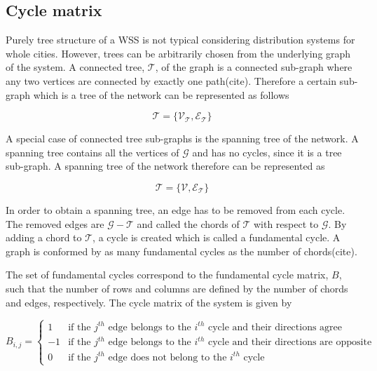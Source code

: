 \subsection{Cycle matrix}
\label{cycle_matrix}

Purely tree structure of a WSS is not typical considering distribution systems for whole cities. However, trees can be arbitrarily chosen from the underlying graph of the system. A connected tree, $\mathcal{T} $, of the graph is a connected sub-graph where any two vertices are connected by exactly one path(cite). Therefore a certain sub-graph which is a tree of the network can be represented as follows

\begin{equation}
  \label{Numberofchords}
  \mathcal{T} = \{\mathcal{V_{\mathcal{T}}}, \mathcal{E_{\mathcal{T}}} \} 
\end{equation}

A special case of connected tree sub-graphs is the spanning tree of the network. A spanning tree contains all the vertices of $\mathcal{G}$ and has no cycles, since it is a tree sub-graph. A spanning tree of the network therefore can be represented as

\begin{equation}
  \label{Numberofchords}
  \mathcal{T} = \{\mathcal{V}, \mathcal{E_{\mathcal{T}}} \} 
\end{equation}

In order to obtain a spanning tree, an edge has to be removed from each cycle. The removed edges are $\mathcal{G} - \mathcal{T}$ and called the chords of $\mathcal{T}$ with respect to $\mathcal{G}$. By adding a chord to $\mathcal{T}$, a cycle is created which is called a fundamental cycle. A graph is conformed by as many fundamental cycles as the number of chords(cite).

The set of fundamental cycles correspond to the fundamental cycle matrix, $B$, such that the number of rows and columns are defined by the number of chords and edges, respectively. The cycle matrix of the system is given by

\begin{equation}
\label{DiGraphCycle}
 B_{i,j} =
		\left\{
		\begin{array}{ll}
		
		1 			&     \text{if the $j^{th}$ edge belongs to the $i^{th}$ cycle and their directions agree}	
\\
		-1          &     \text{if the $j^{th}$ edge belongs to the $i^{th}$ cycle and their directions are opposite}
\\
        0           &     \text{if the $j^{th}$ edge does not belong to the $i^{th}$ cycle}
		\end{array}
		\right.
\end{equation}	

